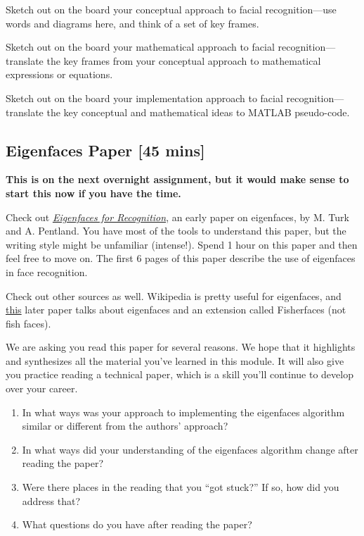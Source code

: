 \begin{prob}
\be
\item Sketch out on the board your conceptual approach to facial recognition---use words and diagrams here, and think of a set of key frames.
\item Sketch out on the board your mathematical approach to facial recognition---translate the key frames from your conceptual approach to mathematical expressions or equations.
\item Sketch out on the board your implementation approach to facial recognition---translate the key conceptual and mathematical ideas to MATLAB pseudo-code.
\ee
\end{prob}

\subsection{Eigenfaces Paper [45 mins]}

\textbf{This is on the next overnight assignment, but it would make sense to start this now if you have the time.}

Check out \href{https://drive.google.com/open?id=0B7LNBbaxYFujTkwxY1BZZEE2eWM}{\textit{Eigenfaces for Recognition}}, an early paper on eigenfaces, by M. Turk and A. Pentland. You have most of the tools to understand this paper, but the writing style might be unfamiliar (intense!). Spend 1 hour on this paper and then feel free to move on. The first 6 pages of this paper describe the use of eigenfaces in face recognition.

Check out other sources as well. Wikipedia is pretty useful for eigenfaces, and \href{https://drive.google.com/open?id=0B7LNBbaxYFujLUFfNThyT2JqNmc}{this} later paper talks about eigenfaces and an extension called Fisherfaces (not fish faces).

\begin{prob}
We are asking you read this paper for several reasons. We hope that it highlights and synthesizes all the material you've learned in this module. It will also give you practice reading a technical paper, which is a skill you'll continue to develop over your career.
\begin{enumerate}
    \item In what ways was your approach to implementing the eigenfaces algorithm similar or different from the authors' approach?
    \item In what ways did your understanding of the eigenfaces algorithm change after reading the paper?
    \item Were there places in the reading that you ``got stuck?'' If so, how did you address that?
    \item What questions do you have after reading the paper?
\end{enumerate}
\end{prob}

